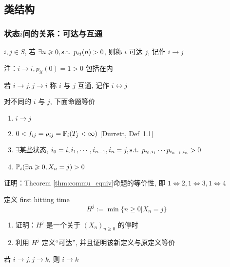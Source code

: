 \subsection{类结构}
\subsubsection{状态$i$间的关系：可达与互通}

\begin{definition}[可达]
    $i,j\in S$, 若 $\exists n\geqslant 0,\text{s.t. } p_{ij}(n)>0$, 则称 $i$ 可达 $j$, 记作 $i\to j$

    注：$i\to i,p_{ii}(0)=1>0$ 包括在内
\end{definition}

\begin{definition}[互通]
    若 $i\to j,j\to i$ 称 $i$ 与 $j$ 互通, 记作 $i\leftrightarrow j$
\end{definition}

\begin{theorem}\label{thm:commu_equiv}
    对不同的 $i$ 与 $j$, 下面命题等价
    \begin{enumerate}
        \item $i\to j$
        \item $0<f_{ij}=\rho_{ij}=\mathbb{P}_i(T_j<\infty)$ [Durrett\cite{durrett}, Def\ 1.1]
        \item $\exists$某些状态, $i_0=i,i_1,\cdots,i_{n-1},i_n=j,\text{s.t. } p_{i_0,i_1}\cdots p_{i_{n-1},i_n}>0$
        \item $\mathbb{P}_i(\exists n\geqslant 0,X_n=j)>0$
    \end{enumerate}
\end{theorem}

\begin{problem}[作业6-1]
    证明：Theorem \ref{thm:commu_equiv}命题的等价性, 即 $1\Leftrightarrow 2,1\Leftrightarrow 3, 1\Leftrightarrow 4$
\end{problem}

\begin{problem}[作业6-2]
    定义 first hitting time
    \[
    H^j:=\min\{n\geq 0|X_n=j\}
    \]
    \begin{enumerate}
        \item 证明：$H^j$ 是一个关于 $(X_n)_{n\geq 0}$ 的停时
        \item 利用 $H^j$ 定义“可达”, 并且证明该新定义与原定义等价
    \end{enumerate}
\end{problem}

\begin{property}
    若 $i\to j,j\to k$, 则 $i\to k$
\end{property}

